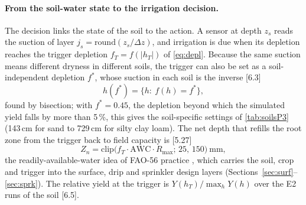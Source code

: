 \paragraph{From the soil-water state to the irrigation decision.}
\label{sec:sys-decision}
The decision links the state of the soil to the action. A sensor at depth $z_s$ reads the suction of layer $j_s=\mathrm{round}(z_s/\Delta z)$, and irrigation is due when its depletion reaches the trigger depletion $f_T=f(|h_T|)$ of \cref{eq:depl}. Because the same suction means different dryness in different soils, the trigger can also be set as a soil-independent depletion $f^\ast$, whose suction in each soil is the inverse [6.3]
\begin{equation}
h(f^\ast)=\{h:\ f(h)=f^\ast\},
\label{eq:invdepl}
\end{equation}
found by bisection; with $f^\ast=0.45$, the depletion beyond which the simulated yield falls by more than 5\,\%, this gives the soil-specific settings of \cref{tab:soilsP3} (143\,cm for sand to 729\,cm for silty clay loam). The net depth that refills the root zone from the trigger back to field capacity is [5.27]
\begin{equation}
Z_n=\mathrm{clip}\bigl(f_T\cdot\mathrm{AWC}\cdot R_{\max};\,25,\,150\bigr)\ \mathrm{mm},
\label{eq:Zn}
\end{equation}
the readily-available-water idea of FAO-56 practice \citep{Allen1998}, which carries the soil, crop and trigger into the surface, drip and sprinkler design layers (Sections~\ref{sec:surf}--\ref{sec:sprk}). The relative yield at the trigger is $Y(h_T)/\max_hY(h)$ over the E2 runs of the soil [6.5].
